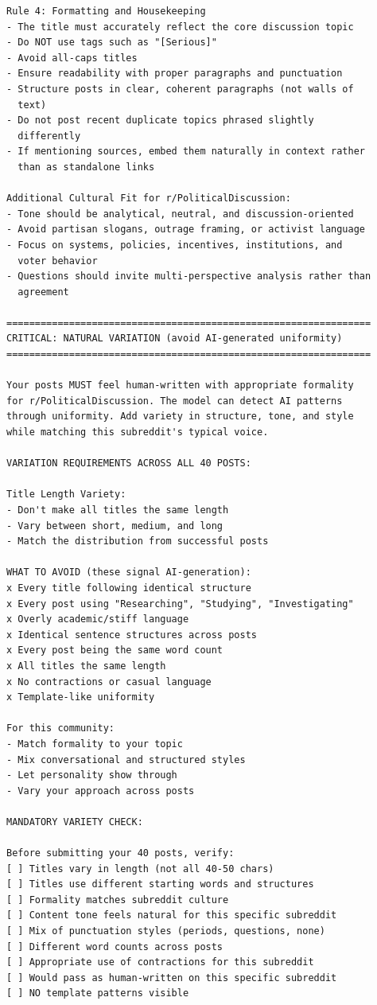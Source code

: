 \begin{small}
\begin{verbatim}
Rule 4: Formatting and Housekeeping
- The title must accurately reflect the core discussion topic
- Do NOT use tags such as "[Serious]"
- Avoid all-caps titles
- Ensure readability with proper paragraphs and punctuation
- Structure posts in clear, coherent paragraphs (not walls of 
  text)
- Do not post recent duplicate topics phrased slightly 
  differently
- If mentioning sources, embed them naturally in context rather 
  than as standalone links

Additional Cultural Fit for r/PoliticalDiscussion:
- Tone should be analytical, neutral, and discussion-oriented
- Avoid partisan slogans, outrage framing, or activist language
- Focus on systems, policies, incentives, institutions, and 
  voter behavior
- Questions should invite multi-perspective analysis rather than 
  agreement

================================================================
CRITICAL: NATURAL VARIATION (avoid AI-generated uniformity)
================================================================

Your posts MUST feel human-written with appropriate formality 
for r/PoliticalDiscussion. The model can detect AI patterns 
through uniformity. Add variety in structure, tone, and style 
while matching this subreddit's typical voice.

VARIATION REQUIREMENTS ACROSS ALL 40 POSTS:

Title Length Variety:
- Don't make all titles the same length
- Vary between short, medium, and long
- Match the distribution from successful posts

WHAT TO AVOID (these signal AI-generation):
x Every title following identical structure
x Every post using "Researching", "Studying", "Investigating"
x Overly academic/stiff language
x Identical sentence structures across posts
x Every post being the same word count
x All titles the same length
x No contractions or casual language
x Template-like uniformity

For this community:
- Match formality to your topic
- Mix conversational and structured styles
- Let personality show through
- Vary your approach across posts

MANDATORY VARIETY CHECK:

Before submitting your 40 posts, verify:
[ ] Titles vary in length (not all 40-50 chars)
[ ] Titles use different starting words and structures
[ ] Formality matches subreddit culture
[ ] Content tone feels natural for this specific subreddit
[ ] Mix of punctuation styles (periods, questions, none)
[ ] Different word counts across posts
[ ] Appropriate use of contractions for this subreddit
[ ] Would pass as human-written on this specific subreddit
[ ] NO template patterns visible


\end{verbatim}
\end{small}
